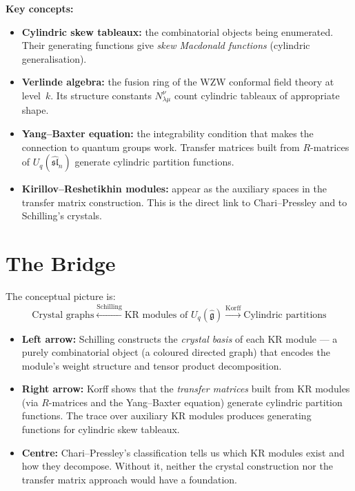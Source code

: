 \documentclass[11pt]{article}
\begin{document}
\medskip
\noindent\textbf{Key concepts:}
\begin{itemize}
  \item \textbf{Cylindric skew tableaux:} the combinatorial objects
    being enumerated.  Their generating functions give
    \emph{skew Macdonald functions} (cylindric generalisation).
  \item \textbf{Verlinde algebra:} the fusion ring of the
    WZW conformal field theory at level~$k$.  Its structure constants
    $N_{\lambda\mu}^\nu$ count cylindric tableaux of appropriate shape.
  \item \textbf{Yang--Baxter equation:} the integrability condition
    that makes the connection to quantum groups work.  Transfer
    matrices built from $R$-matrices of $U_q(\widehat{\mathfrak{sl}}_n)$
    generate cylindric partition functions.
  \item \textbf{Kirillov--Reshetikhin modules:} appear as the
    auxiliary spaces in the transfer matrix construction.  This is the
    direct link to Chari--Pressley and to Schilling's crystals.
\end{itemize}

\section{The Bridge}

The conceptual picture is:
\[
\boxed{\text{Crystal graphs}}
\xleftarrow{\text{Schilling}}
\boxed{\text{KR modules of } U_q(\hat{\mathfrak{g}})}
\xrightarrow{\text{Korff}}
\boxed{\text{Cylindric partitions}}
\]

\begin{itemize}
  \item \textbf{Left arrow:}
    Schilling constructs the \emph{crystal basis} of each KR module ---
    a purely combinatorial object (a coloured directed graph) that
    encodes the module's weight structure and tensor product
    decomposition.

  \item \textbf{Right arrow:}
    Korff shows that the \emph{transfer matrices} built from KR modules
    (via $R$-matrices and the Yang--Baxter equation) generate
    cylindric partition functions.  The trace over auxiliary KR modules
    produces generating functions for cylindric skew tableaux.

  \item \textbf{Centre:}
    Chari--Pressley's classification tells us which KR modules exist
    and how they decompose.  Without it, neither the crystal
    construction nor the transfer matrix approach would have a
    foundation.
\end{itemize}
\end{document}
